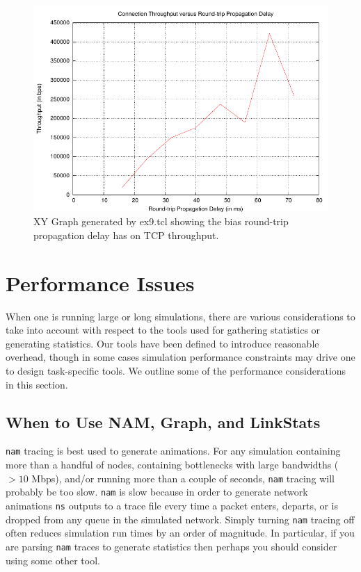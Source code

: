 \documentclass[11pt]{article}
\begin{document}
\begin{figure}
\centerline{\includegraphics[width=4.5in]{xy_vs_time0_plot1}} 
\caption{XY Graph generated by ex9.tcl showing the bias round-trip propagation delay has on TCP throughput.}\label{Ex9Graph}

\end{figure}

\section{Performance Issues}

When one is running large or long simulations, there are various
considerations to take into account with respect to the tools used for
gathering statistics or generating statistics.  Our tools have been
defined to introduce reasonable overhead, though in some cases
simulation performance constraints may drive one to design
task-specific tools.  We outline some of the performance
considerations in this section.

\subsection{When to Use NAM, Graph, and LinkStats}

\verb|nam| tracing is best used to generate animations.  For any
simulation containing more than a handful of nodes, containing
bottlenecks with large bandwidths ($>10$ Mbps), and/or running more
than a couple of seconds, \verb|nam| tracing will probably be too
slow.  \verb|nam| is slow because in order to generate network
animations \verb|ns| outputs to a trace file every time a packet
enters, departs, or is dropped from any queue in the simulated
network.  Simply turning \verb|nam| tracing off often reduces
simulation run times by an order of magnitude.  In particular, if you
are parsing \verb|nam| traces to generate statistics then perhaps you
should consider using some other tool.
\end{document}
